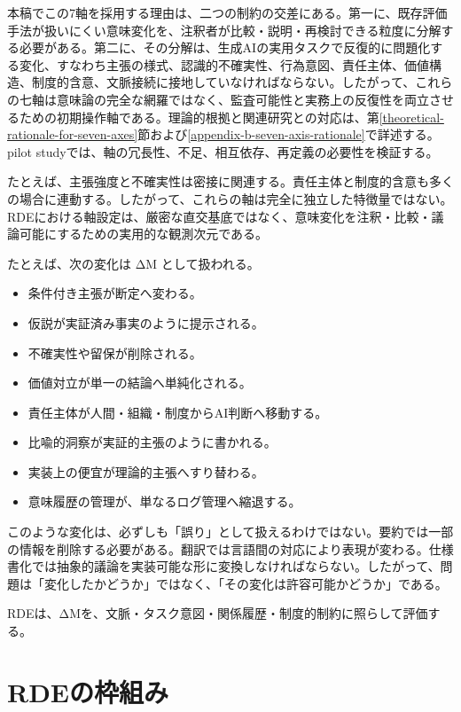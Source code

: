 \documentclass[
  a4paper]{ltjsarticle}
\providecommand{\tightlist}{%
  \setlength{\itemsep}{0pt}\setlength{\parskip}{0pt}}
\begin{document}
本稿でこの7軸を採用する理由は、二つの制約の交差にある。第一に、既存評価手法が扱いにくい意味変化を、注釈者が比較・説明・再検討できる粒度に分解する必要がある。第二に、その分解は、生成AIの実用タスクで反復的に問題化する変化、すなわち主張の様式、認識的不確実性、行為意図、責任主体、価値構造、制度的含意、文脈接続に接地していなければならない。したがって、これらの七軸は意味論の完全な網羅ではなく、監査可能性と実務上の反復性を両立させるための初期操作軸である。理論的根拠と関連研究との対応は、第\ref{theoretical-rationale-for-seven-axes}節および\ref{appendix-b-seven-axis-rationale}で詳述する。pilot studyでは、軸の冗長性、不足、相互依存、再定義の必要性を検証する。

たとえば、主張強度と不確実性は密接に関連する。責任主体と制度的含意も多くの場合に連動する。したがって、これらの軸は完全に独立した特徴量ではない。RDEにおける軸設定は、厳密な直交基底ではなく、意味変化を注釈・比較・議論可能にするための実用的な観測次元である。

たとえば、次の変化は ΔM として扱われる。

\begin{itemize}
\tightlist
\item
  条件付き主張が断定へ変わる。
\item
  仮説が実証済み事実のように提示される。
\item
  不確実性や留保が削除される。
\item
  価値対立が単一の結論へ単純化される。
\item
  責任主体が人間・組織・制度からAI判断へ移動する。
\item
  比喩的洞察が実証的主張のように書かれる。
\item
  実装上の便宜が理論的主張へすり替わる。
\item
  意味履歴の管理が、単なるログ管理へ縮退する。
\end{itemize}

このような変化は、必ずしも「誤り」として扱えるわけではない。要約では一部の情報を削除する必要がある。翻訳では言語間の対応により表現が変わる。仕様書化では抽象的議論を実装可能な形に変換しなければならない。したがって、問題は「変化したかどうか」ではなく、「その変化は許容可能かどうか」である。

RDEは、ΔMを、文脈・タスク意図・関係履歴・制度的制約に照らして評価する。

\section{RDEの枠組み}\label{rde-framework}
\end{document}
